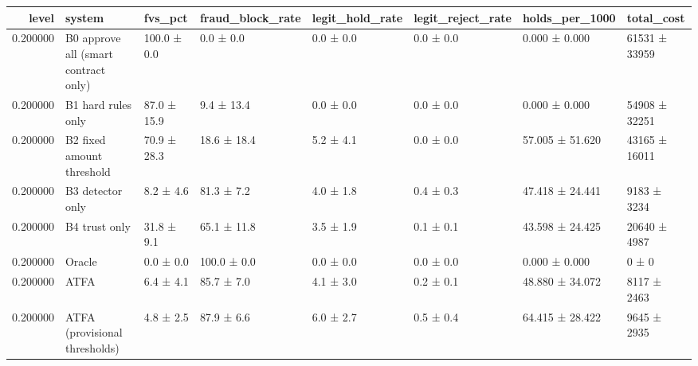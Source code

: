 \begin{tabular}{rlllllll}
\toprule
level & system & fvs\_pct & fraud\_block\_rate & legit\_hold\_rate & legit\_reject\_rate & holds\_per\_1000 & total\_cost \\
\midrule
0.200000 & B0 approve all (smart contract only) & 100.0 ± 0.0 & 0.0 ± 0.0 & 0.0 ± 0.0 & 0.0 ± 0.0 & 0.000 ± 0.000 & 61531 ± 33959 \\
0.200000 & B1 hard rules only & 87.0 ± 15.9 & 9.4 ± 13.4 & 0.0 ± 0.0 & 0.0 ± 0.0 & 0.000 ± 0.000 & 54908 ± 32251 \\
0.200000 & B2 fixed amount threshold & 70.9 ± 28.3 & 18.6 ± 18.4 & 5.2 ± 4.1 & 0.0 ± 0.0 & 57.005 ± 51.620 & 43165 ± 16011 \\
0.200000 & B3 detector only & 8.2 ± 4.6 & 81.3 ± 7.2 & 4.0 ± 1.8 & 0.4 ± 0.3 & 47.418 ± 24.441 & 9183 ± 3234 \\
0.200000 & B4 trust only & 31.8 ± 9.1 & 65.1 ± 11.8 & 3.5 ± 1.9 & 0.1 ± 0.1 & 43.598 ± 24.425 & 20640 ± 4987 \\
0.200000 & Oracle & 0.0 ± 0.0 & 100.0 ± 0.0 & 0.0 ± 0.0 & 0.0 ± 0.0 & 0.000 ± 0.000 & 0 ± 0 \\
0.200000 & ATFA & 6.4 ± 4.1 & 85.7 ± 7.0 & 4.1 ± 3.0 & 0.2 ± 0.1 & 48.880 ± 34.072 & 8117 ± 2463 \\
0.200000 & ATFA (provisional thresholds) & 4.8 ± 2.5 & 87.9 ± 6.6 & 6.0 ± 2.7 & 0.5 ± 0.4 & 64.415 ± 28.422 & 9645 ± 2935 \\
\bottomrule
\end{tabular}
